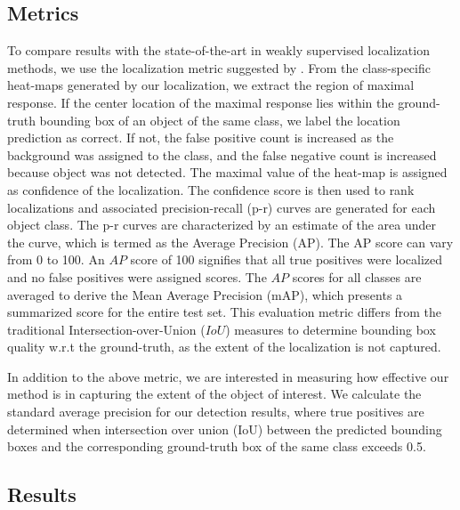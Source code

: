 \documentclass[runningheads]{llncs}
\begin{document}
\subsection{Metrics}
To compare results with the state-of-the-art in weakly supervised localization methods, we use the localization metric suggested by \cite{oquabobject}. From the class-specific heat-maps generated by our localization, we extract the region of maximal response. If the center location of the maximal response lies within the ground-truth bounding box of an object of the same class, we label the location prediction as correct. If not, the false positive count is increased as the background was assigned to the class, and the false negative count is increased because object was not detected. The maximal value of the heat-map is assigned as confidence of the localization. The confidence score is then used to rank localizations and associated precision-recall (p-r) curves are generated for each object class. The p-r curves are characterized by an estimate of the area under the curve, which is termed as the Average Precision (AP). The AP score can vary from 0 to 100. An $AP$ score of 100 signifies that all true positives were localized and no false positives were assigned scores. The $AP$ scores for all classes are averaged to derive the Mean Average Precision (mAP), which presents a summarized score for the entire test set. This evaluation metric differs from the traditional Intersection-over-Union ($IoU$) measures to determine bounding box quality w.r.t the ground-truth, as the extent of the localization is not captured.

In addition to the above metric, we are interested in measuring how effective our method is in capturing the extent of the object of interest. We calculate the standard average precision for our detection results, where true positives are determined when intersection over union (IoU) between the predicted bounding boxes and the corresponding ground-truth box of the same class exceeds 0.5.
\subsection{Results}
\end{document}
